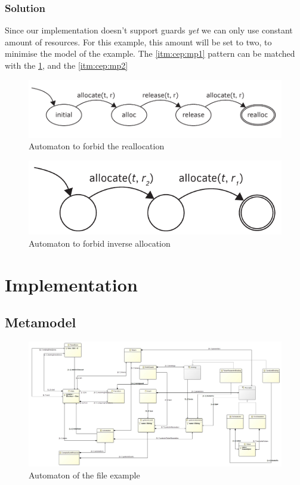 			\subsubsection{Solution}
				Since our implementation doesn't support guards \emph{yet} we can only use constant amount of resources.
				For this example, this amount will be set to two, to minimise the model of the example.
				The \cref{itm:cep:mp1} pattern can be matched with the \cref {fig:cep:marsautomaton1}, and the \cref{itm:cep:mp2} 

				\begin{figure}[h]
				\centering
				\includegraphics[width=0.7\linewidth]{include/figures/chapter_5/mars_example_aut1}
				\caption{Automaton to forbid the reallocation}
				\label{fig:cep:marsautomaton1}
				\end{figure}		
				
				
				\begin{figure}[h]
				\centering
				\includegraphics[width=0.7\linewidth]{include/figures/chapter_5/mars_example_aut2}
				\caption{Automaton to forbid inverse allocation}
				\label{fig:cep:marsautomaton2}
				\end{figure}	

				
				
	\section{Implementation}
		\subsection{Metamodel}
		
			\begin{figure}[h]
			\centering
			\includegraphics[width=0.9\linewidth]{include/figures/chapter_5/model}
			\caption{Automaton of the file example}
			\label{fig:cep:model}
			\end{figure}
		
